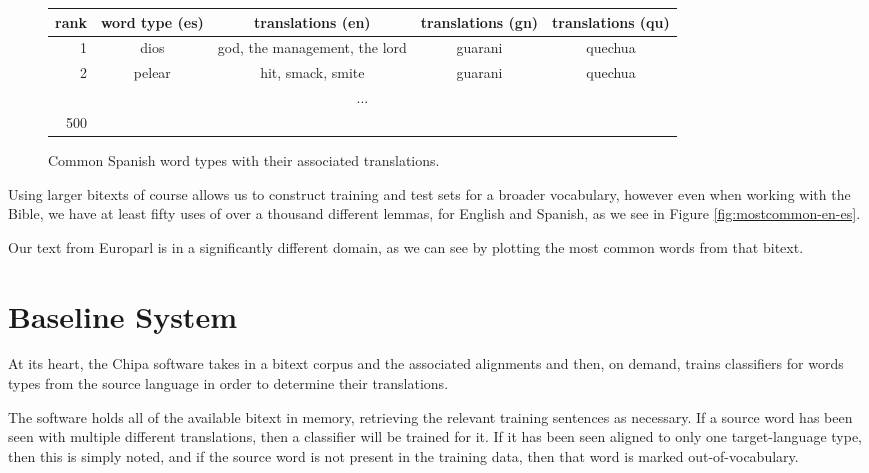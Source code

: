 \begin{figure*}
  \begin{centering}
  \begin{tabular}{|r|c|c|c|c|}
    \hline
    rank & word type (es) & translations (en) & translations (gn) & translations (qu) \\
    \hline
    1    & dios   &  god, the management, the lord & guarani & quechua \\
    2    & pelear &  hit, smack, smite             & guarani & quechua \\
    \multicolumn{5}{|c|}{...} \\ 
    500 &  & & & \\
    \hline
  \end{tabular}
  \end{centering}
  \caption{Common Spanish word types with their associated translations.}
  \label{fig:mostcommon-es-translations}
\end{figure*}

Using larger bitexts of course allows us to construct training and test sets
for a broader vocabulary, however even when working with the Bible, we have
at least fifty uses of over a thousand different lemmas, for English and
Spanish, as we see in Figure \ref{fig:mostcommon-en-es}.

Our text from Europarl is in a significantly different domain, as we can see by
plotting the most common words from that bitext.

\section{Baseline System}

At its heart, the Chipa software takes in a bitext corpus and the associated
alignments and then, on demand, trains classifiers for words types from the
source language in order to determine their translations.

The software holds all of the available bitext in memory, retrieving the
relevant training sentences as necessary.
If a source word has been seen with multiple different translations, then a
classifier will be trained for it. If it has been seen aligned to only one
target-language type, then this is simply noted, and if the source word is not
present in the training data, then that word is marked out-of-vocabulary.


